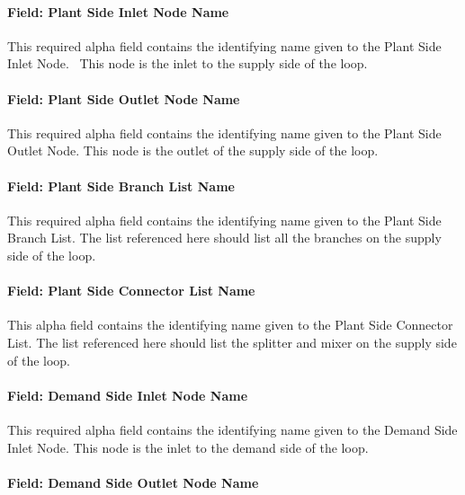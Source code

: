 \paragraph{Field: Plant Side Inlet Node Name}\label{field-plant-side-inlet-node-name}

This required alpha field contains the identifying name given to the Plant Side Inlet Node.~ This node is the inlet to the supply side of the loop.

\paragraph{Field: Plant Side Outlet Node Name}\label{field-plant-side-outlet-node-name}

This required alpha field contains the identifying name given to the Plant Side Outlet Node. This node is the outlet of the supply side of the loop.

\paragraph{Field: Plant Side Branch List Name}\label{field-plant-side-branch-list-name}

This required alpha field contains the identifying name given to the Plant Side Branch List. The list referenced here should list all the branches on the supply side of the loop.

\paragraph{Field: Plant Side Connector List Name}\label{field-plant-side-connector-list-name}

This alpha field contains the identifying name given to the Plant Side Connector List. The list referenced here should list the splitter and mixer on the supply side of the loop.

\paragraph{Field: Demand Side Inlet Node Name}\label{field-demand-side-inlet-node-name}

This required alpha field contains the identifying name given to the Demand Side Inlet Node. This node is the inlet to the demand side of the loop.

\paragraph{Field: Demand Side Outlet Node Name}\label{field-demand-side-outlet-node-name-000}

